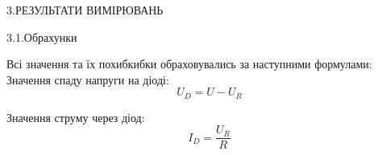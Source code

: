\documentclass[14pt,a4paper]{scrartcl}
\begin{document}
\begin{center}
\begin{figure}[h]
\caption[wec]{ }
\label{ris:image}
\end{figure}
\end{center}








\clearpage
\newpage
\begin{center}3.РЕЗУЛЬТАТИ ВИМІРЮВАНЬ\\ \end{center}
\begin{center}3.1.Обрахунки\\ \end{center}
Всі значення та їх похибкибки обраховувались за наступними формулами:\\
Значення спаду напруги на діоді:
\begin{equation}
U_D = U-U_R
\end{equation}

Значення струму через діод:
\begin{equation}
I_D = \dfrac{U_R}R
\end{equation}
\end{document}
